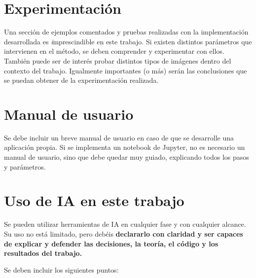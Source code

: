 \documentclass[a4paper]{article}
\begin{document}
\section{Experimentación}

Una sección de ejemplos comentados y pruebas realizadas con la implementación desarrollada es {\textit imprescindible} en este trabajo. Si existen distintos parámetros que intervienen en el método, se deben comprender y experimentar con ellos. También puede ser de interés probar distintos tipos de imágenes dentro del contexto del trabajo. Igualmente importantes (o más) serán las conclusiones que se puedan obtener de la experimentación realizada. 


\section{Manual de usuario}

Se debe incluir un breve manual de usuario en caso de que se desarrolle una aplicación propia. Si se implementa un notebook de Jupyter, no es necesario un manual de usuario, sino que debe quedar muy guiado, explicando todos los pasos y parámetros.  

\section{Uso de IA en este trabajo} Se pueden utilizar herramientas de IA en cualquier fase y con cualquier alcance. Su uso no está limitado, pero debéis \textbf{declararlo con claridad y ser capaces de explicar y defender las decisiones, la teoría, el código y los resultados del trabajo.} 

Se deben incluir los siguientes puntos:
\end{document}
